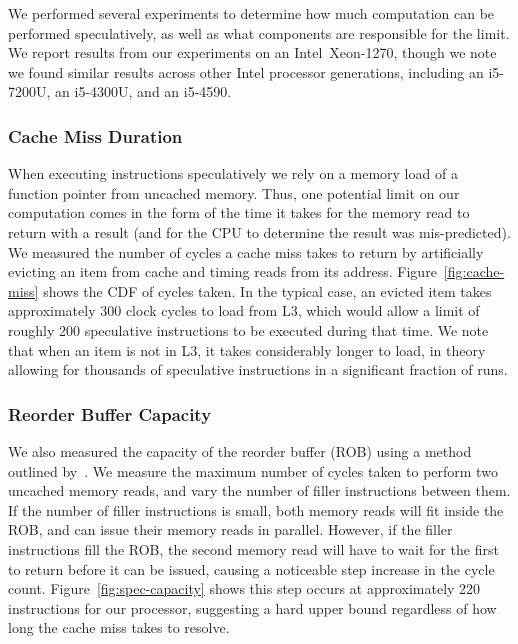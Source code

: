 We performed several experiments to determine how much computation can be
performed
speculatively, as well as what components are responsible for the limit.
We report results from our experiments on an Intel~Xeon-1270,
though we note we found similar results across other Intel processor generations,
including an i5-7200U, %
an i5-4300U, %
and an i5-4590. %



\subsubsection{Cache Miss Duration}
When executing instructions speculatively we rely on a memory load of a function
pointer from uncached memory. Thus, one potential limit on our computation comes
in the form of the time it takes for the memory read to return with a result
(and for the CPU to determine the result was mis-predicted).
We measured the number of cycles a
cache miss takes to return by artificially evicting an item from cache and
timing reads from its address.
Figure~\ref{fig:cache-miss} shows the CDF of cycles taken. In the typical case,
an evicted item takes approximately 300 clock cycles to load from L3, which
would allow a limit of roughly 200 speculative instructions to be
executed during that time. We note that when an item is not in L3, it takes
considerably longer to load, in theory allowing for thousands of speculative
instructions in a significant fraction of runs.


\subsubsection{Reorder Buffer Capacity} \label{sssec:ROB}
We also measured the capacity of the reorder buffer (ROB) using a method
outlined by~\cite{measuring-rob}. We measure the maximum number of cycles taken to
perform two uncached memory reads, and vary the number of filler instructions
between them. If the number of filler instructions is small, both memory reads
will fit inside the ROB, and can issue their memory reads in parallel. However,
if the filler instructions fill the ROB, the second memory read will have to
wait for the first to return before it can be issued, causing a noticeable step
increase in the cycle count.
Figure~\ref{fig:spec-capacity}
shows this step occurs at approximately 220 instructions for our processor,
suggesting a hard upper bound regardless of how long the cache miss takes to
resolve.

